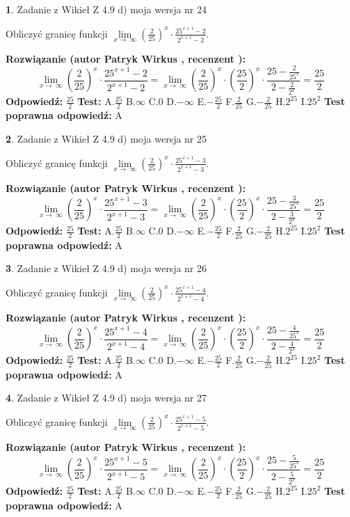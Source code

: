 \documentclass[12pt, a4paper]{article}
\theoremstyle{definition} %
\newtheorem{zad}{}
\newcommand{\zadStart}[1]{\begin{zad}#1\newline}
\newcommand{\zadStop}{\end{zad}}
\newcommand{\rozwStart}[2]{\noindent \textbf{Rozwiązanie (autor #1 , recenzent #2): }\newline}
\newcommand{\rozwStop}{\newline}
\newcommand{\odpStart}{\noindent \textbf{Odpowiedź:}\newline}
\newcommand{\odpStop}{\newline}
\newcommand{\testStart}{\noindent \textbf{Test:}\newline}
\newcommand{\testStop}{\newline}
\newcommand{\kluczStart}{\noindent \textbf{Test poprawna odpowiedź:}\newline}
\newcommand{\kluczStop}{\newline}
\begin{document}
\zadStart{Zadanie z Wikieł Z 4.9 d) moja wersja nr 24}


Obliczyć granicę funkcji  $\lim\limits_{x\to\ \infty}(\frac{2}{25})^{x}\cdot\frac{25^{x+1}-2}{2^{x+1}-2}$.
\zadStop
\rozwStart{Patryk Wirkus}{}
$$\lim\limits_{x\to\ \infty}(\frac{2}{25})^{x}\cdot\frac{25^{x+1}-2}{2^{x+1}-2}=\lim\limits_{x\to\ \infty}(\frac{2}{25})^{x}\cdot(\frac{25}{2})^{x} \cdot \frac{25-\frac{2}{25^{x}}}{2-\frac{2}{2^{x}}} = \frac{25}{2}$$
\rozwStop
\odpStart
$\frac{25}{2}$
\odpStop
\testStart
A.$\frac{25}{2}$ B.$\infty$ C.$0$ D.$-\infty$ E.$-\frac{25}{2}$
F.$\frac{2}{25}$ G.$-\frac{2}{25}$
H.$2^{25}$
I.$25^{2}$
\testStop
\kluczStart
A
\kluczStop



\zadStart{Zadanie z Wikieł Z 4.9 d) moja wersja nr 25}


Obliczyć granicę funkcji  $\lim\limits_{x\to\ \infty}(\frac{2}{25})^{x}\cdot\frac{25^{x+1}-3}{2^{x+1}-3}$.
\zadStop
\rozwStart{Patryk Wirkus}{}
$$\lim\limits_{x\to\ \infty}(\frac{2}{25})^{x}\cdot\frac{25^{x+1}-3}{2^{x+1}-3}=\lim\limits_{x\to\ \infty}(\frac{2}{25})^{x}\cdot(\frac{25}{2})^{x} \cdot \frac{25-\frac{3}{25^{x}}}{2-\frac{3}{2^{x}}} = \frac{25}{2}$$
\rozwStop
\odpStart
$\frac{25}{2}$
\odpStop
\testStart
A.$\frac{25}{2}$ B.$\infty$ C.$0$ D.$-\infty$ E.$-\frac{25}{2}$
F.$\frac{2}{25}$ G.$-\frac{2}{25}$
H.$2^{25}$
I.$25^{2}$
\testStop
\kluczStart
A
\kluczStop



\zadStart{Zadanie z Wikieł Z 4.9 d) moja wersja nr 26}


Obliczyć granicę funkcji  $\lim\limits_{x\to\ \infty}(\frac{2}{25})^{x}\cdot\frac{25^{x+1}-4}{2^{x+1}-4}$.
\zadStop
\rozwStart{Patryk Wirkus}{}
$$\lim\limits_{x\to\ \infty}(\frac{2}{25})^{x}\cdot\frac{25^{x+1}-4}{2^{x+1}-4}=\lim\limits_{x\to\ \infty}(\frac{2}{25})^{x}\cdot(\frac{25}{2})^{x} \cdot \frac{25-\frac{4}{25^{x}}}{2-\frac{4}{2^{x}}} = \frac{25}{2}$$
\rozwStop
\odpStart
$\frac{25}{2}$
\odpStop
\testStart
A.$\frac{25}{2}$ B.$\infty$ C.$0$ D.$-\infty$ E.$-\frac{25}{2}$
F.$\frac{2}{25}$ G.$-\frac{2}{25}$
H.$2^{25}$
I.$25^{2}$
\testStop
\kluczStart
A
\kluczStop



\zadStart{Zadanie z Wikieł Z 4.9 d) moja wersja nr 27}


Obliczyć granicę funkcji  $\lim\limits_{x\to\ \infty}(\frac{2}{25})^{x}\cdot\frac{25^{x+1}-5}{2^{x+1}-5}$.
\zadStop
\rozwStart{Patryk Wirkus}{}
$$\lim\limits_{x\to\ \infty}(\frac{2}{25})^{x}\cdot\frac{25^{x+1}-5}{2^{x+1}-5}=\lim\limits_{x\to\ \infty}(\frac{2}{25})^{x}\cdot(\frac{25}{2})^{x} \cdot \frac{25-\frac{5}{25^{x}}}{2-\frac{5}{2^{x}}} = \frac{25}{2}$$
\rozwStop
\odpStart
$\frac{25}{2}$
\odpStop
\testStart
A.$\frac{25}{2}$ B.$\infty$ C.$0$ D.$-\infty$ E.$-\frac{25}{2}$
F.$\frac{2}{25}$ G.$-\frac{2}{25}$
H.$2^{25}$
I.$25^{2}$
\testStop
\kluczStart
A
\kluczStop
\end{document}
